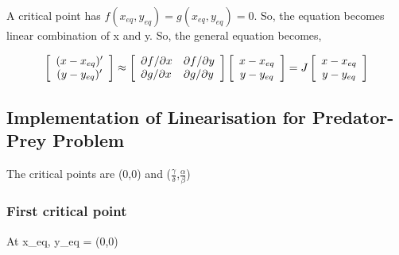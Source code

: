 \documentclass[12pt]{article}
\begin{document}
A critical point has $ f ( x_{eq} , y_{eq} ) = g ( x_{eq} , y_{eq} ) = 0 $. So, the equation becomes linear combination of x and y. So, the general equation becomes,

\begin{equation*}
    \left[ \begin{array} { c } ( x - x_{eq} ) ^ { \prime } \\ ( y - y_{eq} ) ^ { \prime } \end{array} \right] \approx \left[ \begin{array} { l l } \partial f / \partial x & \partial f / \partial y \\ \partial g / \partial x & \partial g / \partial y \end{array} \right] \left[ \begin{array} { c } x - x_{eq} \\ y - y_{eq} \end{array} \right] = J \left[ \begin{array} { c } x - x_{eq} \\ y - y_{eq} \end{array} \right] 
\end{equation*}

\subsection*{Implementation of Linearisation for Predator-Prey Problem}

The critical points are (0,0) and ($\frac{\gamma}{\delta}$,$\frac{\alpha}{\beta}$) \\
\subsubsection*{First critical point}
At x_{eq}, y_{eq} = (0,0) \\
\end{document}
